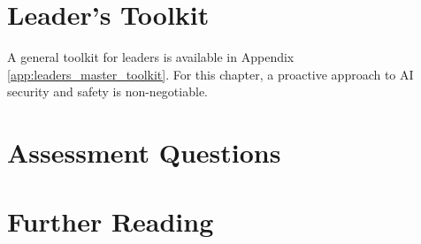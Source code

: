 \section{Leader's Toolkit}
\label{sec:security_leaders_toolkit}

A general toolkit for leaders is available in Appendix \ref{app:leaders_master_toolkit}. For this chapter, a proactive approach to AI security and safety is non-negotiable.

\section{Assessment Questions}
\label{sec:security_assessment_questions}

\section{Further Reading}
\label{sec:security_further_reading}
